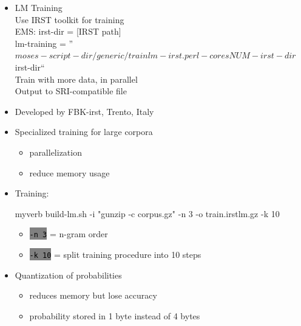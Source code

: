 \documentclass[landscape]{uedslides2C}
\newcommand{\littlecode}[1]{\colorbox{gray}{\textcolor{black}{\small \tt #1}}}
\begin{document}


\begin{itemize} \itemsep -1mm

\item {LM Training}
  \\ Use IRST toolkit for training
  \\ EMS: irst-dir = [IRST path]
  \\      lm-training = ''$moses-script-dir/generic/trainlm-irst.perl -cores NUM -irst-dir $irst-dir``
  \\ Train with more data, in parallel
  \\ Output to SRI-compatible file

\end{itemize}

\vspace{10mm}
\begin{itemize}

\item Developed by FBK-irst, Trento, Italy

\item Specialized training for large corpora
	\begin{itemize}
	\item parallelization
	\item reduce memory usage
	\end{itemize}
\item Training: \\
\begin{SaveVerbatim}{myverb} 
build-lm.sh -i "gunzip -c corpus.gz" -n 3 
      -o train.irstlm.gz -k 10
\end{SaveVerbatim}
\colorbox{gray}{}

\begin{itemize}
\item \littlecode{-n 3} = n-gram order
\item \littlecode{-k 10} = split training procedure into 10 steps
\end{itemize}

\item Quantization of probabilities
	\begin{itemize}
	\item reduces memory but lose accuracy
	\item probability stored in 1 byte instead of 4 bytes
	\end{itemize}

\end{itemize}
\end{document}
